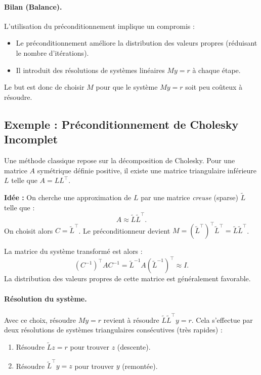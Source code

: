 \paragraph{Bilan (Balance).}
L'utilisation du préconditionnement implique un compromis :
\begin{itemize}
    \item[(+)] Le préconditionnement améliore la distribution des valeurs propres (réduisant le nombre d'itérations).
    \item[(-)] Il introduit des résolutions de systèmes linéaires $M y = r$ à chaque étape.
\end{itemize}
Le but est donc de choisir $M$ pour que le système $M y = r$ soit peu coûteux à résoudre.

\subsection{Exemple : Préconditionnement de Cholesky Incomplet}

Une méthode classique repose sur la décomposition de Cholesky. Pour une matrice $A$ symétrique définie positive, il existe une matrice triangulaire inférieure $L$ telle que $A = L L^\top$.

\textbf{Idée :} On cherche une approximation de $L$ par une matrice \emph{creuse} (sparse) $\tilde{L}$ telle que :
\[
A \approx \tilde{L} \tilde{L}^\top.
\]
On choisit alors $C = \tilde{L}^\top$.
Le préconditionneur devient $M = (\tilde{L}^\top)^\top \tilde{L}^\top = \tilde{L} \tilde{L}^\top$.

La matrice du système transformé est alors :
\[
(C^{-1})^\top A C^{-1} = \tilde{L}^{-1} A (\tilde{L}^{-1})^\top \approx I.
\]
La distribution des valeurs propres de cette matrice est généralement favorable.

\paragraph{Résolution du système.}
Avec ce choix, résoudre $M y = r$ revient à résoudre $\tilde{L} \tilde{L}^\top y = r$. Cela s'effectue par deux résolutions de systèmes triangulaires consécutives (très rapides) :
\begin{enumerate}
    \item Résoudre $\tilde{L} z = r$ pour trouver $z$ (descente).
    \item Résoudre $\tilde{L}^\top y = z$ pour trouver $y$ (remontée).
\end{enumerate}


